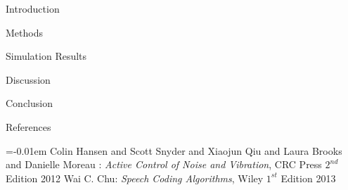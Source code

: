 \documentclass[a0paper,landscape]{baposter}
\begin{document}
\begin{poster}
\begin{posterbox}[name=intro,column=0,span=1,row=0,height=0.25]{Introduction}

\end{posterbox}

\begin{posterbox}[name=Materials,column=0,below=intro, above=bottom]{Methods}

\end{posterbox}

\begin{posterbox}[name=Results,column=1,row=0,height=0.88,span=2]{Simulation Results}

\end{posterbox}

\begin{posterbox}[name=discussion,column=3,row=0,height=0.5]{Discussion}

\end{posterbox}

\begin{posterbox}[name=conclusion,column=3,below=discussion,above=bottom]{Conclusion}
	
\end{posterbox}

%	


\begin{posterbox}[name=refs,column=1,span=2,above=bottom]{References}

\begin{thebibliography}{1}%
\itemsep=-0.01em%
\setlength{\baselineskip}{0.4em}%
 Colin Hansen and Scott Snyder and Xiaojun Qiu and Laura Brooks and Danielle Moreau  : \emph{Active Control of Noise and Vibration}, CRC Press $2^{nd}$ Edition 2012
 Wai C. Chu: \emph{Speech Coding Algorithms}, Wiley $1^{st}$ Edition 2013
\end{thebibliography}
\end{posterbox}



\end{poster}
\end{document}
